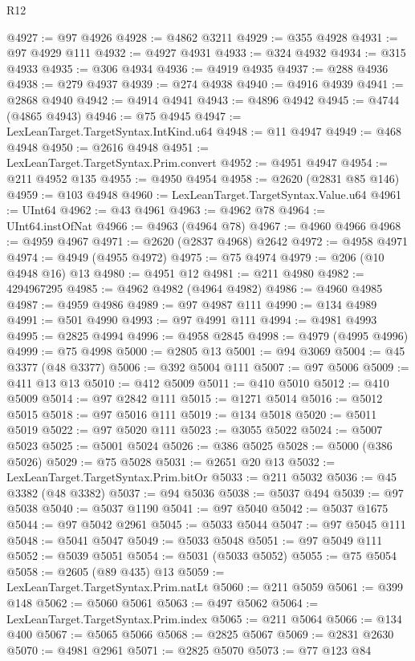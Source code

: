 \begin{lexlean}{R12}
\begin{coremodule}
@4927 := @97 @4926
@4928 := @4862 @3211
@4929 := @355 @4928
@4931 := @97 @4929 @111
@4932 := @4927 @4931
@4933 := @324 @4932
@4934 := @315 @4933
@4935 := @306 @4934
@4936 := @4919 @4935
@4937 := @288 @4936
@4938 := @279 @4937
@4939 := @274 @4938
@4940 := @4916 @4939
@4941 := @2868 @4940
@4942 := @4914 @4941
@4943 := @4896 @4942
@4945 := @4744 (@4865 @4943)
@4946 := @75 @4945
@4947 := LexLeanTarget.TargetSyntax.IntKind.u64
@4948 := @11 @4947
@4949 := @468 @4948
@4950 := @2616 @4948
@4951 := LexLeanTarget.TargetSyntax.Prim.convert
@4952 := @4951 @4947
@4954 := @211 @4952 @135
@4955 := @4950 @4954
@4958 := @2620 (@2831 @85 @146)
@4959 := @103 @4948
@4960 := LexLeanTarget.TargetSyntax.Value.u64
@4961 := UInt64
@4962 := @43 @4961
@4963 := @4962 @78
@4964 := UInt64.instOfNat
@4966 := @4963 (@4964 @78)
@4967 := @4960 @4966
@4968 := @4959 @4967
@4971 := @2620 (@2837 @4968) @2642
@4972 := @4958 @4971
@4974 := @4949 (@4955 @4972)
@4975 := @75 @4974
@4979 := @206 (@10 @4948 @16) @13
@4980 := @4951 @12
@4981 := @211 @4980
@4982 := 4294967295
@4985 := @4962 @4982 (@4964 @4982)
@4986 := @4960 @4985
@4987 := @4959 @4986
@4989 := @97 @4987 @111
@4990 := @134 @4989
@4991 := @501 @4990
@4993 := @97 @4991 @111
@4994 := @4981 @4993
@4995 := @2825 @4994
@4996 := @4958 @2845
@4998 := @4979 (@4995 @4996)
@4999 := @75 @4998
@5000 := @2805 @13
@5001 := @94 @3069
@5004 := @45 @3377 (@48 @3377)
@5006 := @392 @5004 @111
@5007 := @97 @5006
@5009 := @411 @13 @13
@5010 := @412 @5009
@5011 := @410 @5010
@5012 := @410 @5009
@5014 := @97 @2842 @111
@5015 := @1271 @5014
@5016 := @5012 @5015
@5018 := @97 @5016 @111
@5019 := @134 @5018
@5020 := @5011 @5019
@5022 := @97 @5020 @111
@5023 := @3055 @5022
@5024 := @5007 @5023
@5025 := @5001 @5024
@5026 := @386 @5025
@5028 := @5000 (@386 @5026)
@5029 := @75 @5028
@5031 := @2651 @20 @13
@5032 := LexLeanTarget.TargetSyntax.Prim.bitOr
@5033 := @211 @5032
@5036 := @45 @3382 (@48 @3382)
@5037 := @94 @5036
@5038 := @5037 @494
@5039 := @97 @5038
@5040 := @5037 @1190
@5041 := @97 @5040
@5042 := @5037 @1675
@5044 := @97 @5042 @2961
@5045 := @5033 @5044
@5047 := @97 @5045 @111
@5048 := @5041 @5047
@5049 := @5033 @5048
@5051 := @97 @5049 @111
@5052 := @5039 @5051
@5054 := @5031 (@5033 @5052)
@5055 := @75 @5054
@5058 := @2605 (@89 @435) @13
@5059 := LexLeanTarget.TargetSyntax.Prim.natLt
@5060 := @211 @5059
@5061 := @399 @148
@5062 := @5060 @5061
@5063 := @497 @5062
@5064 := LexLeanTarget.TargetSyntax.Prim.index
@5065 := @211 @5064
@5066 := @134 @400
@5067 := @5065 @5066
@5068 := @2825 @5067
@5069 := @2831 @2630
@5070 := @4981 @2961
@5071 := @2825 @5070
@5073 := @77 @123 @84

\end{coremodule}
\end{lexlean}
